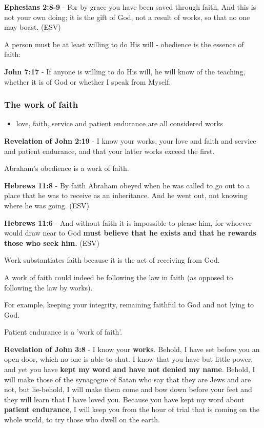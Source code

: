 \documentclass[11pt]{article}
\begin{document}
\textbf{Ephesians 2:8-9} - For by grace you have been saved through faith. And this is not your own doing; it is the gift of God, not a result of works, so that no one may boast. (ESV)

A person must be at least willing to do His will - obedience is the essence of faith:

\textbf{John 7:17} - If anyone is willing to do His will, he will know of the teaching, whether it is of God or whether I speak from Myself.

\subsubsection{The work of faith}
\label{sec:org224e9fb}
\begin{itemize}
\item love, faith, service and patient endurance are all considered works
\end{itemize}

\textbf{Revelation of John 2:19} - I know your works, your love and faith and service and patient endurance, and that your latter works exceed the first.

Abraham's obedience is a work of faith.

\textbf{Hebrews 11:8} - By faith Abraham obeyed when he was called to go out to a place that he was to receive as an inheritance. And he went out, not knowing where he was going. (ESV)

\textbf{Hebrews 11:6} - And without faith it is impossible to please him, for whoever would draw near to God \textbf{must believe that he exists and that he rewards those who seek him.} (ESV)

Work substantiates faith because it is the act of receiving from God.

A work of faith could indeed be following the law in faith (as opposed to following the law by works).

For example, keeping your integrity, remaining faithful to God and not lying to God.

Patient endurance is a 'work of faith'.

\textbf{Revelation of John 3:8} - I know your \textbf{works}. Behold, I have set before you an open door, which no one is able to shut. I know that you have but little power, and yet you have \textbf{kept my word and have not denied my name}. Behold, I will make those of the synagogue of Satan who say that they are Jews and are not, but lie-behold, I will make them come and bow down before your feet and they will learn that I have loved you. Because you have kept my word about \textbf{patient endurance}, I will keep you from the hour of trial that is coming on the whole world, to try those who dwell on the earth.
\end{document}
